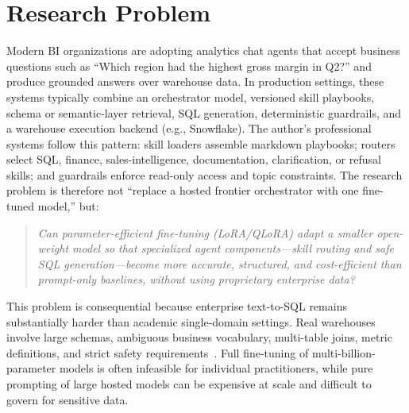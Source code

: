 \documentclass[conference]{IEEEtran}
\begin{document}
\section{Research Problem}
\label{sec:problem}
Modern BI organizations are adopting analytics chat agents that accept business questions such as ``Which region had the highest gross margin in Q2?'' and produce grounded answers over warehouse data. In production settings, these systems typically combine an orchestrator model, versioned skill playbooks, schema or semantic-layer retrieval, SQL generation, deterministic guardrails, and a warehouse execution backend (e.g., Snowflake). The author's professional systems follow this pattern: skill loaders assemble markdown playbooks; routers select SQL, finance, sales-intelligence, documentation, clarification, or refusal skills; and guardrails enforce read-only access and topic constraints.
The research problem is therefore not ``replace a hosted frontier orchestrator with one fine-tuned model,'' but:
\begin{quote}
\textit{Can parameter-efficient fine-tuning (LoRA/QLoRA) adapt a smaller open-weight model so that specialized agent components---skill routing and safe SQL generation---become more accurate, structured, and cost-efficient than prompt-only baselines, without using proprietary enterprise data?}
\end{quote}
This problem is consequential because enterprise text-to-SQL remains substantially harder than academic single-domain settings. Real warehouses involve large schemas, ambiguous business vocabulary, multi-table joins, metric definitions, and strict safety requirements~\cite{yu2018spider,lei2025spider2}. Full fine-tuning of multi-billion-parameter models is often infeasible for individual practitioners, while pure prompting of large hosted models can be expensive at scale and difficult to govern for sensitive data.
\end{document}
